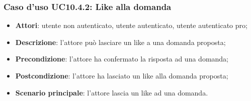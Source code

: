 \subsubsection{Caso d'uso UC10.4.2: Like alla domanda}
	\begin{itemize}
		\item \textbf{Attori}: utente non autenticato, utente autenticato, utente autenticato pro;
		\item \textbf{Descrizione}: l'attore può lasciare un like a una domanda proposta;
		\item \textbf{Precondizione}: l'attore ha confermato la risposta ad una domanda;
		\item \textbf{Postcondizione}: l'attore ha lasciato un like alla domanda proposta;
		\item \textbf{Scenario principale}: l'attore lascia un like ad una domanda.
	\end{itemize}
	
